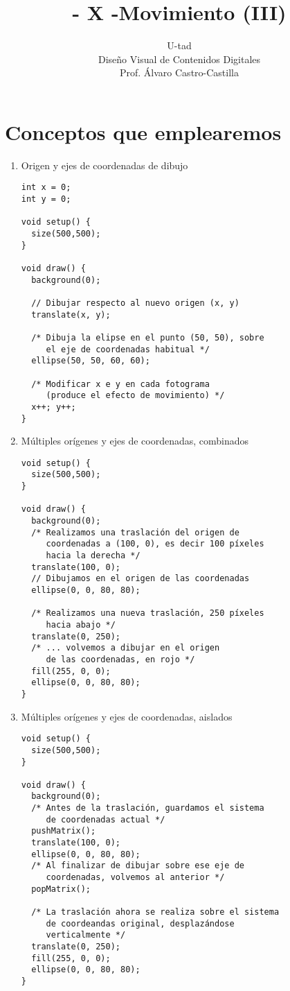 \documentclass[a4paper,oneside]{article}
\title{- X -\linebreak Movimiento (III)}
\author{U-tad\\ Diseño Visual de Contenidos Digitales\\ Prof. Álvaro Castro-Castilla}
\date{}
\begin{document}
\maketitle


\section{Conceptos que emplearemos}
\begin{enumerate}
  \item Origen y ejes de coordenadas de dibujo

    \begin{verbatim}
int x = 0;
int y = 0;

void setup() {
  size(500,500); 
}

void draw() {
  background(0);
  
  // Dibujar respecto al nuevo origen (x, y)
  translate(x, y);
  
  /* Dibuja la elipse en el punto (50, 50), sobre
     el eje de coordenadas habitual */
  ellipse(50, 50, 60, 60);
  
  /* Modificar x e y en cada fotograma
     (produce el efecto de movimiento) */
  x++; y++;
}
    \end{verbatim}

\newpage
  \item Múltiples orígenes y ejes de coordenadas, combinados

    \begin{verbatim}
void setup() {
  size(500,500); 
}

void draw() {
  background(0);
  /* Realizamos una traslación del origen de
     coordenadas a (100, 0), es decir 100 píxeles
     hacia la derecha */
  translate(100, 0);
  // Dibujamos en el origen de las coordenadas
  ellipse(0, 0, 80, 80);
  
  /* Realizamos una nueva traslación, 250 píxeles
     hacia abajo */
  translate(0, 250);
  /* ... volvemos a dibujar en el origen
     de las coordenadas, en rojo */
  fill(255, 0, 0);
  ellipse(0, 0, 80, 80);
}
    \end{verbatim}

  \item Múltiples orígenes y ejes de coordenadas, aislados

    \begin{verbatim}
void setup() {
  size(500,500); 
}

void draw() {
  background(0);
  /* Antes de la traslación, guardamos el sistema
     de coordenadas actual */
  pushMatrix();
  translate(100, 0);
  ellipse(0, 0, 80, 80);
  /* Al finalizar de dibujar sobre ese eje de
     coordenadas, volvemos al anterior */
  popMatrix();
  
  /* La traslación ahora se realiza sobre el sistema
     de coordeandas original, desplazándose
     verticalmente */
  translate(0, 250);
  fill(255, 0, 0);
  ellipse(0, 0, 80, 80);
}
    \end{verbatim}

\end{enumerate}
\end{document}

